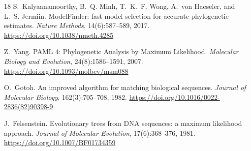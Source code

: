\documentclass[10pt,letterpaper]{article}
\begin{document}
\begin{thebibliography}{18}
S.~Kalyaanamoorthy, B.~Q. Minh, T.~K.~F. Wong, A.~von Haeseler, and L.~S. Jermiin.
\newblock ModelFinder: fast model selection for accurate phylogenetic estimates.
\newblock \emph{Nature Methods}, 14(6):587--589, 2017. \url{https://doi.org/10.1038/nmeth.4285}

Z.~Yang.
\newblock PAML 4: Phylogenetic Analysis by Maximum Likelihood.
\newblock \emph{Molecular Biology and Evolution}, 24(8):1586--1591, 2007. \url{https://doi.org/10.1093/molbev/msm088}

O.~Gotoh.
\newblock An improved algorithm for matching biological sequences.
\newblock \emph{Journal of Molecular Biology}, 162(3):705--708, 1982. \url{https://doi.org/10.1016/0022-2836(82)90398-9}

J.~Felsenstein.
\newblock Evolutionary trees from DNA sequences: a maximum likelihood approach.
\newblock \emph{Journal of Molecular Evolution}, 17(6):368--376, 1981. \url{https://doi.org/10.1007/BF01734359}
\end{thebibliography}
\end{document}
